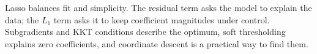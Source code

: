 \documentclass[11pt,a4paper,oneside]{book}
\begin{document}
\begin{keyidea}[title=One final mental model]
Lasso balances fit and simplicity. The residual term asks the model to explain the data; the $L_1$ term asks it to keep coefficient magnitudes under control. Subgradients and KKT conditions describe the optimum, soft thresholding explains zero coefficients, and coordinate descent is a practical way to find them.
\end{keyidea}
\end{document}
